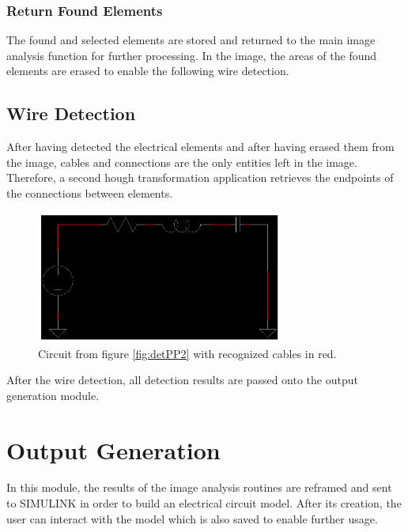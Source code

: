 \documentclass[10pt,twocolumn,letterpaper]{article}
\begin{document}
\subsubsection*{Return Found Elements}

The found and selected elements are stored and returned to the main image analysis function for further processing. In the image, the areas of the found elements are erased to enable the following wire detection.

\subsection{Wire Detection}
\label{subsec:wire}

After having detected the electrical elements and after having erased them from the image, cables and connections are the only entities left in the image. Therefore, a second hough transformation application retrieves the endpoints of the connections between elements.
\par

\begin{figure}[!ht]
\includegraphics[width = 3.2in]{img/connections_after.png}
\caption{Circuit from figure \ref{fig:detPP2} with recognized cables in red.}
\label{fig:c10}
\end{figure}

\par
After the wire detection, all detection results are passed onto the output generation module.


\section{Output Generation}
\label{sec:output}

In this module, the results of the image analysis routines are reframed and sent to SIMULINK in order to build an electrical circuit model. After its creation, the user can interact with the model which is also saved to enable further usage.
\end{document}
